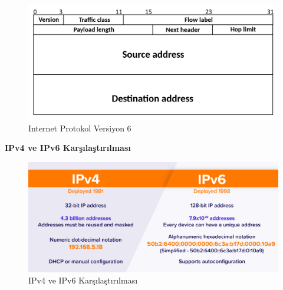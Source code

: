 \begin{figure}[!htb]
    \centering
    \includegraphics[width=1\linewidth]{00-images/10-internet_protocol_v6.png}
    \caption{Internet Protokol Versiyon 6}
    \label{fig:my_label}
\end{figure}

\newpage

\vspace{10mm}
\textbf{IPv4 ve IPv6 Karşılaştırılması}
\vspace{5mm}

\begin{figure}[!htb]
    \centering
    \includegraphics[width=1\linewidth]{00-images/15-ipv4_vs_ipv6.png}
    \caption{IPv4 ve IPv6 Karşılaştırılması}
    \label{fig:my_label}
\end{figure}

